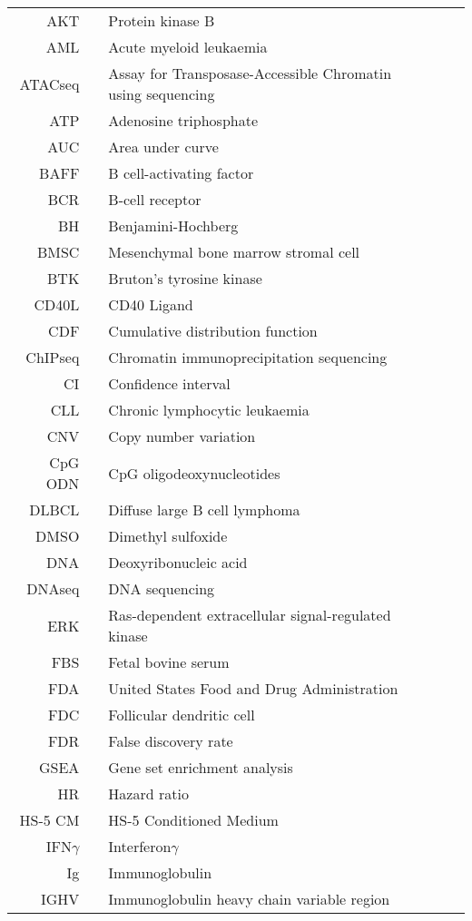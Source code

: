 \documentclass[11pt, a4paper, twosided]{book}
\begin{document}
\begin{tabular}{rp{0.2cm}lp{1cm}rp{0.2cm}l}
    AKT & & Protein kinase B \\
    AML & & Acute myeloid leukaemia \\
    ATACseq & & Assay for Transposase-Accessible Chromatin using sequencing \\
    ATP & & Adenosine triphosphate \\
    AUC & & Area under curve \\
    BAFF & & B cell-activating factor \\
    BCR & & B-cell receptor \\
    BH & & Benjamini-Hochberg \\
    BMSC & & Mesenchymal bone marrow stromal cell \\
    BTK & & Bruton’s tyrosine kinase \\
    CD40L & & CD40 Ligand \\
    CDF & & Cumulative distribution function \\
    ChIPseq & & Chromatin immunoprecipitation sequencing \\
    CI & & Confidence interval \\
    CLL & & Chronic lymphocytic leukaemia \\
    CNV & & Copy number variation \\
    CpG ODN & & CpG oligodeoxynucleotides \\
    DLBCL & & Diffuse large B cell lymphoma \\
    DMSO & & Dimethyl sulfoxide  \\
    DNA & & Deoxyribonucleic acid  \\
    DNAseq & & DNA sequencing \\
    ERK & & Ras-dependent extracellular signal-regulated kinase \\
    FBS & & Fetal bovine serum \\
    FDA & & United States Food and Drug Administration \\
    FDC & & Follicular dendritic cell \\
    FDR & & False discovery rate \\
    GSEA & & Gene set enrichment analysis  \\
    HR & & Hazard ratio  \\
    HS-5 CM & & HS-5 Conditioned Medium  \\
    IFN$\gamma$ & & Interferon$\gamma$   \\  
    Ig & & Immunoglobulin \\
    IGHV & & Immunoglobulin heavy chain variable region \\
  
    
\end{tabular}
\end{document}
